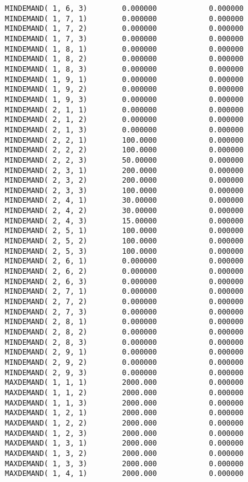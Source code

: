 \documentclass[12pt]{article}
\begin{document}
\begin{appendices}
\begin{lstlisting}
MINDEMAND( 1, 6, 3)        0.000000            0.000000
MINDEMAND( 1, 7, 1)        0.000000            0.000000
MINDEMAND( 1, 7, 2)        0.000000            0.000000
MINDEMAND( 1, 7, 3)        0.000000            0.000000
MINDEMAND( 1, 8, 1)        0.000000            0.000000
MINDEMAND( 1, 8, 2)        0.000000            0.000000
MINDEMAND( 1, 8, 3)        0.000000            0.000000
MINDEMAND( 1, 9, 1)        0.000000            0.000000
MINDEMAND( 1, 9, 2)        0.000000            0.000000
MINDEMAND( 1, 9, 3)        0.000000            0.000000
MINDEMAND( 2, 1, 1)        0.000000            0.000000
MINDEMAND( 2, 1, 2)        0.000000            0.000000
MINDEMAND( 2, 1, 3)        0.000000            0.000000
MINDEMAND( 2, 2, 1)        100.0000            0.000000
MINDEMAND( 2, 2, 2)        100.0000            0.000000
MINDEMAND( 2, 2, 3)        50.00000            0.000000
MINDEMAND( 2, 3, 1)        200.0000            0.000000
MINDEMAND( 2, 3, 2)        200.0000            0.000000
MINDEMAND( 2, 3, 3)        100.0000            0.000000
MINDEMAND( 2, 4, 1)        30.00000            0.000000
MINDEMAND( 2, 4, 2)        30.00000            0.000000
MINDEMAND( 2, 4, 3)        15.00000            0.000000
MINDEMAND( 2, 5, 1)        100.0000            0.000000
MINDEMAND( 2, 5, 2)        100.0000            0.000000
MINDEMAND( 2, 5, 3)        100.0000            0.000000
MINDEMAND( 2, 6, 1)        0.000000            0.000000
MINDEMAND( 2, 6, 2)        0.000000            0.000000
MINDEMAND( 2, 6, 3)        0.000000            0.000000
MINDEMAND( 2, 7, 1)        0.000000            0.000000
MINDEMAND( 2, 7, 2)        0.000000            0.000000
MINDEMAND( 2, 7, 3)        0.000000            0.000000
MINDEMAND( 2, 8, 1)        0.000000            0.000000
MINDEMAND( 2, 8, 2)        0.000000            0.000000
MINDEMAND( 2, 8, 3)        0.000000            0.000000
MINDEMAND( 2, 9, 1)        0.000000            0.000000
MINDEMAND( 2, 9, 2)        0.000000            0.000000
MINDEMAND( 2, 9, 3)        0.000000            0.000000
MAXDEMAND( 1, 1, 1)        2000.000            0.000000
MAXDEMAND( 1, 1, 2)        2000.000            0.000000
MAXDEMAND( 1, 1, 3)        2000.000            0.000000
MAXDEMAND( 1, 2, 1)        2000.000            0.000000
MAXDEMAND( 1, 2, 2)        2000.000            0.000000
MAXDEMAND( 1, 2, 3)        2000.000            0.000000
MAXDEMAND( 1, 3, 1)        2000.000            0.000000
MAXDEMAND( 1, 3, 2)        2000.000            0.000000
MAXDEMAND( 1, 3, 3)        2000.000            0.000000
MAXDEMAND( 1, 4, 1)        2000.000            0.000000

\end{lstlisting}
\end{appendices}
\end{document}
